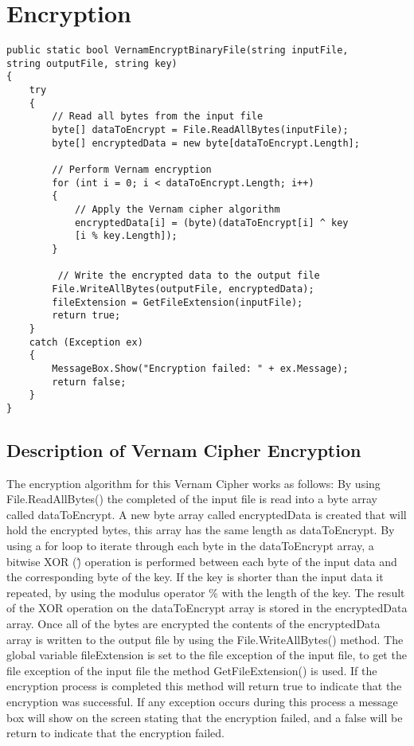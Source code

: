 \documentclass[a4paper,oneside,11pt]{book}
\begin{document}
\section{Encryption}
\begin{lstlisting}[language=Csh, caption={Code for Vernam Cipher Encryption}]
public static bool VernamEncryptBinaryFile(string inputFile, 
string outputFile, string key)
{
    try
    {
        // Read all bytes from the input file
        byte[] dataToEncrypt = File.ReadAllBytes(inputFile);
        byte[] encryptedData = new byte[dataToEncrypt.Length];
    
        // Perform Vernam encryption
        for (int i = 0; i < dataToEncrypt.Length; i++)
        {
            // Apply the Vernam cipher algorithm
            encryptedData[i] = (byte)(dataToEncrypt[i] ^ key
            [i % key.Length]);
        }
    
         // Write the encrypted data to the output file
        File.WriteAllBytes(outputFile, encryptedData);
        fileExtension = GetFileExtension(inputFile);
        return true;
    }
    catch (Exception ex)
    {
        MessageBox.Show("Encryption failed: " + ex.Message);
        return false;
    }
}
\end{lstlisting}

\subsection{Description of Vernam Cipher Encryption}

The encryption algorithm for this Vernam Cipher works as follows:
By using File.ReadAllBytes() the completed of the input file is read into a byte array called dataToEncrypt. A new byte array called encryptedData is created that will hold the encrypted bytes, this array has the same length as dataToEncrypt. By using a for loop to iterate through each byte in the dataToEncrypt array, a bitwise XOR (\^) operation is performed between each byte of the input data and the corresponding byte of the key. If the key is shorter than the input data it repeated, by using the modulus operator \% with the length of the key. The result of the XOR operation on the  dataToEncrypt array is stored in the encryptedData array. Once all of the bytes are encrypted the contents of the encryptedData array is written to the output file by using the File.WriteAllBytes() method. The global variable fileExtension is set to the file exception of the input file, to get the file exception of the input file the method GetFileExtension() is used. If the encryption process is completed this method will return true to indicate that the encryption was successful. If any exception occurs during this process a message box will show on the screen stating that the encryption failed, and a false will be return to indicate that the encryption failed.
\end{document}
